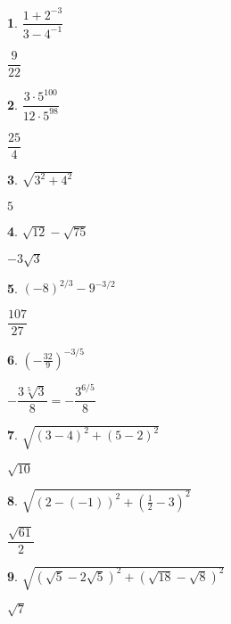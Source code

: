 \documentclass{amsbook}
\newtheorem{exc}{}
\newenvironment{ex}{\begin{exc}\normalfont}{\end{exc}}
\numberwithin{section}{chapter}
\numberwithin{equation}{chapter}
\begin{document}
\begin{multicols}{3}
\begin{ex}
	$\dfrac{1 + 2^{-3}}{3 - 4^{-1}}$
	\begin{sol}
	$\dfrac{9}{22}$	
	\end{sol}
\end{ex}

\begin{ex}
	$\dfrac{3 \cdot 5^{100}}{12\cdot 5^{98}}$
	\begin{sol}
	$\dfrac{25}{4}$	
	\end{sol}
\end{ex}

\begin{ex}
	$\sqrt{3^2 + 4^2}$
	\begin{sol}
	$5$	
	\end{sol}
\end{ex}

\begin{ex}
	$\sqrt{12} - \sqrt{75}$
	\begin{sol}
		$-3\sqrt{3}$
	\end{sol}
\end{ex}

\begin{ex}
	$(-8)^{2/3} - 9^{-3/2}$
	\begin{sol}
	$\dfrac{107}{27}$	
	\end{sol}
\end{ex}

\begin{ex}
	$\left(-\frac{32}{9}\right)^{-3/5}$
	\begin{sol}
		$-\dfrac{3\sqrt[5]{3}}{8} = -\dfrac{3^{6/5}}{8}$
	\end{sol}
\end{ex}


\begin{ex}
	$\sqrt{(3-4)^2 + (5-2)^2}$
	\begin{sol}
		 $\sqrt{10}$
	\end{sol}
\end{ex}

\begin{ex}
	$\sqrt{(2 - (-1))^2 + \left(\frac{1}{2} - 3\right)^2}$ 
	\begin{sol}
	$\dfrac{\sqrt{61}}{2}$ 	
	\end{sol}
\end{ex}

\begin{ex}
	$\sqrt{(\sqrt{5} - 2\sqrt{5})^2 + (\sqrt{18} - \sqrt{8})^2}$
	\begin{sol}
		$\sqrt{7}$
	\end{sol}
\end{ex}


\end{multicols}
\end{document}
